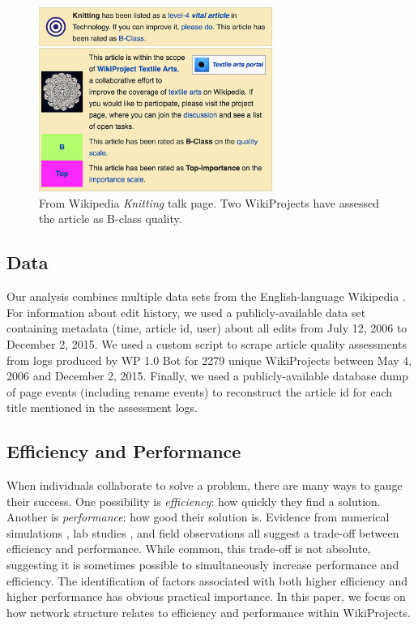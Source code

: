 \documentclass[letterpaper,twocolumn,10pt]{article}
\newcommand{\+}{\phantom{-}}
\begin{document}
\begin{figure}[t!]
\begin{center}
\includegraphics[width=3in]{fig-knitting.png}
\caption{
From Wikipedia {\em Knitting} talk page.
Two WikiProjects have assessed the article as B-class quality.
\label{fig:knitting}
}
\end{center}
\end{figure}

\subsection{Data}

Our analysis combines multiple data
sets from the English-language Wikipedia \cite{platt_english_2018}.
For information about edit history, we used a publicly-available data set containing
metadata (time, article id, user) about all edits from July 12, 2006 to December 2, 2015.
We used a custom script to scrape article quality assessments from logs produced
by WP 1.0 Bot for 2279 unique WikiProjects
between May 4, 2006 and December 2, 2015.
Finally, we used a publicly-available database dump of page events (including rename events)
to reconstruct the article id for each title mentioned in the assessment logs.

\subsection{Efficiency and Performance}

When individuals collaborate to solve a problem,
there are many ways to gauge their success.
One possibility is {\em efficiency}:
how quickly they find a solution.
Another is {\em performance}:
how good their solution is.
Evidence from numerical simulations
\cite{lazer_network_2007,mason_propagation_2008,mason_collaborative_2012,grim_scientific_2013,barkoczi_social_2016},
lab studies \cite{kearns_experiments_2012},
and field observations \cite{gentry_consensus_1982}
all suggest a trade-off between efficiency and performance.
While common, this trade-off is not absolute,
suggesting it is sometimes possible to simultaneously increase
performance and efficiency.
The identification of factors associated with both higher efficiency
and higher performance has obvious practical importance.
In this paper, we focus on how network structure
relates to efficiency and performance within WikiProjects.
\end{document}
